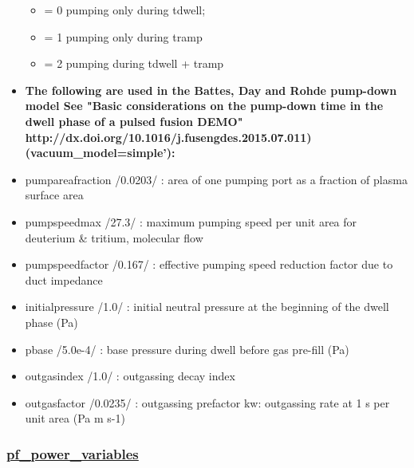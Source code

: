 \documentclass[]{article}
\providecommand{\tightlist}{%
  \setlength{\itemsep}{0pt}\setlength{\parskip}{0pt}}
\begin{document}
\begin{itemize}
  \begin{itemize}
  \tightlist
  \item
    = 0 pumping only during tdwell;
  \item
    = 1 pumping only during tramp
  \item
    = 2 pumping during tdwell + tramp
  \end{itemize}
\item
  \textbf{The following are used in the Battes, Day and Rohde pump-down
  model See "Basic considerations on the pump-down time in the dwell
  phase of a pulsed fusion DEMO"
  http://dx.doi.org/10.1016/j.fusengdes.2015.07.011)
  (vacuum\_model=simple'):}
\item
  pumpareafraction /0.0203/ : area of one pumping port as a fraction of
  plasma surface area
\item
  pumpspeedmax /27.3/ : maximum pumping speed per unit area for
  deuterium \& tritium, molecular flow
\item
  pumpspeedfactor /0.167/ : effective pumping speed reduction factor due
  to duct impedance
\item
  initialpressure /1.0/ : initial neutral pressure at the beginning of
  the dwell phase (Pa)
\item
  pbase /5.0e-4/ : base pressure during dwell before gas pre-fill (Pa)
\item
  outgasindex /1.0/ : outgassing decay index
\item
  outgasfactor /0.0235/ : outgassing prefactor kw: outgassing rate at 1
  s per unit area (Pa m s-1)
\end{itemize}

\hypertarget{pf_power_variables}{%
\subsubsection{\texorpdfstring{\href{pf_power_variables.html}{pf\_power\_variables}}{pf\_power\_variables}}\label{pf_power_variables}}
\end{document}
